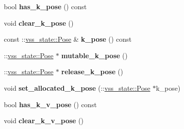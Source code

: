\begin{DoxyCompactItemize}
\item 
bool {\bfseries has\+\_\+k\+\_\+pose} () const \hypertarget{classvss__state_1_1Robot__State_a7754831605dadf0fa81b739f1ebf920d}{}\label{classvss__state_1_1Robot__State_a7754831605dadf0fa81b739f1ebf920d}

\item 
void {\bfseries clear\+\_\+k\+\_\+pose} ()\hypertarget{classvss__state_1_1Robot__State_a1adc3e3ef2845d0da77660cc3879969c}{}\label{classvss__state_1_1Robot__State_a1adc3e3ef2845d0da77660cc3879969c}

\item 
const \+::\hyperlink{classvss__state_1_1Pose}{vss\+\_\+state\+::\+Pose} \& {\bfseries k\+\_\+pose} () const \hypertarget{classvss__state_1_1Robot__State_a35253ee22b61da81e9bca8d0c3f338fc}{}\label{classvss__state_1_1Robot__State_a35253ee22b61da81e9bca8d0c3f338fc}

\item 
\+::\hyperlink{classvss__state_1_1Pose}{vss\+\_\+state\+::\+Pose} $\ast$ {\bfseries mutable\+\_\+k\+\_\+pose} ()\hypertarget{classvss__state_1_1Robot__State_ac807165c96cb5b59ae5341cc46f38996}{}\label{classvss__state_1_1Robot__State_ac807165c96cb5b59ae5341cc46f38996}

\item 
\+::\hyperlink{classvss__state_1_1Pose}{vss\+\_\+state\+::\+Pose} $\ast$ {\bfseries release\+\_\+k\+\_\+pose} ()\hypertarget{classvss__state_1_1Robot__State_aadc71d6c4cdd034e934ad365e333f11c}{}\label{classvss__state_1_1Robot__State_aadc71d6c4cdd034e934ad365e333f11c}

\item 
void {\bfseries set\+\_\+allocated\+\_\+k\+\_\+pose} (\+::\hyperlink{classvss__state_1_1Pose}{vss\+\_\+state\+::\+Pose} $\ast$k\+\_\+pose)\hypertarget{classvss__state_1_1Robot__State_a4d69689931c42cfc30b748e267674d99}{}\label{classvss__state_1_1Robot__State_a4d69689931c42cfc30b748e267674d99}

\item 
bool {\bfseries has\+\_\+k\+\_\+v\+\_\+pose} () const \hypertarget{classvss__state_1_1Robot__State_a9a83b1c1730126c70d7d9e72bd9309b8}{}\label{classvss__state_1_1Robot__State_a9a83b1c1730126c70d7d9e72bd9309b8}

\item 
void {\bfseries clear\+\_\+k\+\_\+v\+\_\+pose} ()\hypertarget{classvss__state_1_1Robot__State_a72c6e0df54535999e45d050ae93e696f}{}\label{classvss__state_1_1Robot__State_a72c6e0df54535999e45d050ae93e696f}


\end{DoxyCompactItemize}
